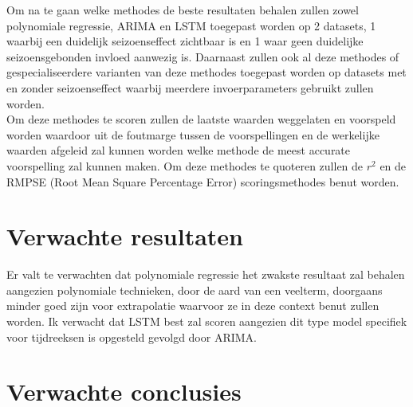 Om na te gaan welke methodes de beste resultaten behalen zullen zowel polynomiale regressie, ARIMA en LSTM toegepast worden op 2 datasets, 1 waarbij een duidelijk seizoenseffect zichtbaar is en 1 waar geen duidelijke seizoensgebonden invloed aanwezig is. Daarnaast zullen ook al deze methodes of gespecialiseerdere varianten van deze methodes toegepast worden op datasets met en zonder seizoenseffect waarbij meerdere invoerparameters gebruikt zullen worden. \\
Om deze methodes te scoren zullen de laatste waarden weggelaten en voorspeld worden waardoor uit de foutmarge tussen de voorspellingen en de werkelijke waarden afgeleid zal kunnen worden welke methode de meest accurate voorspelling zal kunnen maken. Om deze methodes te quoteren zullen de \(r^2\)  en de RMPSE (Root Mean Square Percentage Error) scoringsmethodes benut worden.

\section{Verwachte resultaten}
\label{sec:verwachte_resultaten}

Er valt te verwachten dat polynomiale regressie het zwakste resultaat zal behalen aangezien polynomiale technieken, door de aard van een veelterm, doorgaans minder goed zijn voor extrapolatie waarvoor ze in deze context benut zullen worden. Ik verwacht dat LSTM best zal scoren aangezien dit type model specifiek voor tijdreeksen is opgesteld gevolgd door ARIMA.

\section{Verwachte conclusies}
\label{sec:verwachte_conclusies}


